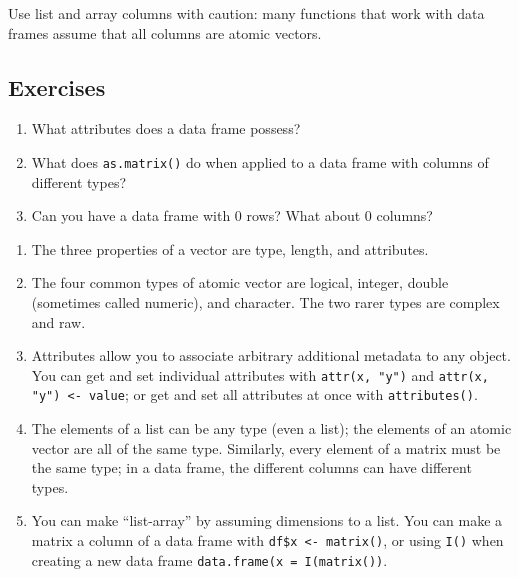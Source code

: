 Use list and array columns with caution: many functions that work with
data frames assume that all columns are atomic vectors.

\subsection{Exercises}

\begin{enumerate}
\def\labelenumi{\arabic{enumi}.}
\item
  What attributes does a data frame possess?
\item
  What does \texttt{as.matrix()} do when applied to a data frame with
  columns of different types?
\item
  Can you have a data frame with 0 rows? What about 0 columns?
\end{enumerate}


\begin{enumerate}
\def\labelenumi{\arabic{enumi}.}
\item
  The three properties of a vector are type, length, and attributes.
\item
  The four common types of atomic vector are logical, integer, double
  (sometimes called numeric), and character. The two rarer types are
  complex and raw.
\item
  Attributes allow you to associate arbitrary additional metadata to any
  object. You can get and set individual attributes with
  \texttt{attr(x, "y")} and \texttt{attr(x, "y") \textless{}- value}; or
  get and set all attributes at once with \texttt{attributes()}.
\item
  The elements of a list can be any type (even a list); the elements of
  an atomic vector are all of the same type. Similarly, every element of
  a matrix must be the same type; in a data frame, the different columns
  can have different types.
\item
  You can make ``list-array'' by assuming dimensions to a list. You can
  make a matrix a column of a data frame with
  \texttt{df\$x \textless{}- matrix()}, or using \texttt{I()} when
  creating a new data frame \texttt{data.frame(x = I(matrix())}.
\end{enumerate}
